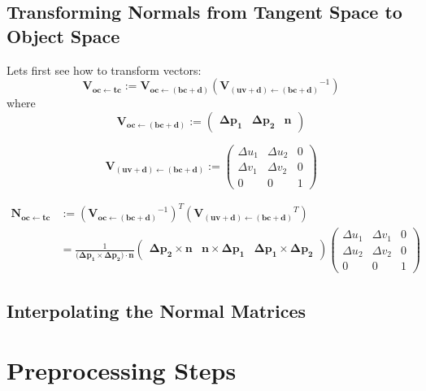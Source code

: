 \documentclass{article}
\newcommand{\vctr}[1]{\mathbf{#1}}
\newcommand{\point}[1]{\mathbf{#1}}
\newcommand{\mat}[1]{\mathbf{#1}}
\newcommand{\vMat}[2]{\mat{V_{#1 \leftarrow #2}}}
\newcommand{\nMat}[2]{\mat{N_{#1 \leftarrow #2}}}
\begin{document}
\subsection{Transforming Normals from Tangent Space to Object Space}

Lets first see how to transform vectors:
\begin{equation*}
 \vMat{oc}{tc} := \vMat{oc}{(bc+d)}(\vMat{(uv+d)}{(bc+d)}^{-1}) 
\end{equation*}
where
\begin{equation}
\label{eq:vmat_oc_from_bdc}
 \vMat{oc}{(bc+d)} := \begin{pmatrix} 
                  \point{\Delta p_1} & \point{\Delta p_2} & \vctr{n} 
                 \end{pmatrix}
\end{equation}

\begin{equation}
 \vMat{(uv+d)}{(bc+d)} := \begin{pmatrix} 
                  \Delta u_1 & \Delta u_2 & 0 \\
                  \Delta v_1 & \Delta v_2 & 0 \\
                  0 & 0 & 1 
                 \end{pmatrix}
\end{equation}

\begin{align*}
\nMat{oc}{tc} &:= (\vMat{oc}{(bc+d)}^{-1})^T(\vMat{(uv+d)}{(bc+d)}^T) \\
  &= \frac{1}{(\point{\Delta p_1} \times \point{\Delta p_2)}\cdot \vctr{n}}\begin{pmatrix} 
        \point{\Delta p_2} \times \vctr{n} & \vctr{n} \times \point{\Delta p_1} & \point{\Delta p_1} \times \point{\Delta p_2}
     \end{pmatrix}
     \begin{pmatrix} 
                  \Delta u_1 & \Delta v_1 & 0 \\
                  \Delta u_2 & \Delta v_2 & 0 \\
                  0 & 0 & 1 
     \end{pmatrix}
\end{align*}

\subsection{Interpolating the Normal Matrices}

\section{Preprocessing Steps}
\end{document}
